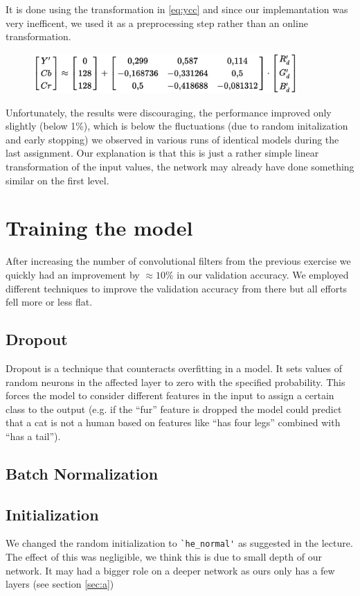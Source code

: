 It is done using the transformation in \eqref{eq:ycc} and since our implemantation was very inefficent, we used it as a preprocessing step rather than an online transformation. 
\begin{figure}
\includegraphics[width=0.9\textwidth]{./img/rgb-ycc.png}
\label{YCCformula}
\end{figure}
Unfortunately, the results were discouraging, the performance improved only slightly (below 1\%), which is below the fluctuations (due to random initalization and early stopping) we observed in various runs of identical models during the last assignment. Our explanation is that this is just a rather simple linear transformation of the input values, the network may already have done something similar on the first level. 




\section{Training the model}
After increasing the number of convolutional filters from the previous exercise we quickly had an improvement by $\approx 10\%$ in our validation accuracy. We employed different techniques to improve the validation accuracy from there but all efforts fell more or less flat. 

\subsection{Dropout \TODO}
Dropout is a technique that counteracts overfitting in a model. It sets values of random neurons in the affected layer to zero with the specified probability. This forces the model to consider different features in the input to assign a certain class to the output (e.g. if the ``fur'' feature is dropped the model could predict that a cat is not a human based on features like ``has four legs'' combined with ``has a tail''). 

\subsection{Batch Normalization \TODO}

\subsection{Initialization}
We changed the random initialization to \lstinline{`he_normal'} \cite{he} as suggested in the lecture. The effect of this was negligible, we think this is due to small depth of our network. It may had a bigger role on a deeper network as ours only has a few layers (see section \ref{sec:a})
